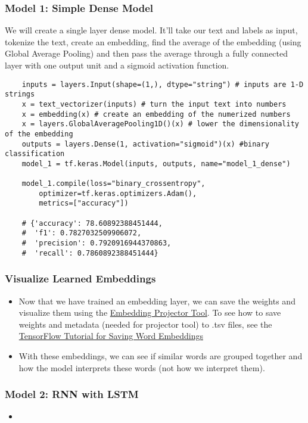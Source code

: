 \documentclass[11pt, a4paper]{article}
\begin{document}
	\subsubsection{Model 1: Simple Dense Model}
	We will create a single layer dense model. It'll take our text and labels as input, tokenize the text, create an embedding, find the average of the embedding (using Global Average Pooling) and then pass the average through a fully connected layer with one output unit and a sigmoid activation function.
	\begin{lstlisting}
	inputs = layers.Input(shape=(1,), dtype="string") # inputs are 1-D strings
	x = text_vectorizer(inputs) # turn the input text into numbers
	x = embedding(x) # create an embedding of the numerized numbers
	x = layers.GlobalAveragePooling1D()(x) # lower the dimensionality of the embedding
	outputs = layers.Dense(1, activation="sigmoid")(x) #binary classification
	model_1 = tf.keras.Model(inputs, outputs, name="model_1_dense")
	
	model_1.compile(loss="binary_crossentropy",
		optimizer=tf.keras.optimizers.Adam(),
		metrics=["accuracy"])
	
	# {'accuracy': 78.60892388451444,
	#  'f1': 0.7827032509906072,
	#  'precision': 0.7920916944370863,
	#  'recall': 0.7860892388451444} \end{lstlisting}

	\subsubsection{Visualize Learned Embeddings}
	\begin{itemize}
		\item Now that we have trained an embedding layer, we can save the weights and visualize them using the \href{https://projector.tensorflow.org/}{Embedding Projector Tool}. To see how to save weights and metadata (needed for projector tool) to .tsv files, see the \href{https://www.tensorflow.org/text/guide/word\_embeddings#retrieve\_the\_trained\_word\_embeddings\_and\_save\_them\_to\_disk}{TensorFlow Tutorial for Saving Word Embeddings}
		\item With these embeddings, we can see if similar words are grouped together and how the model interprets these words (not how we interpret them).
	\end{itemize} \newpage


	\subsubsection{Model 2: RNN with LSTM}
	\begin{itemize}
		\item 
	\end{itemize}
	
	
	
	
	
\end{document}
